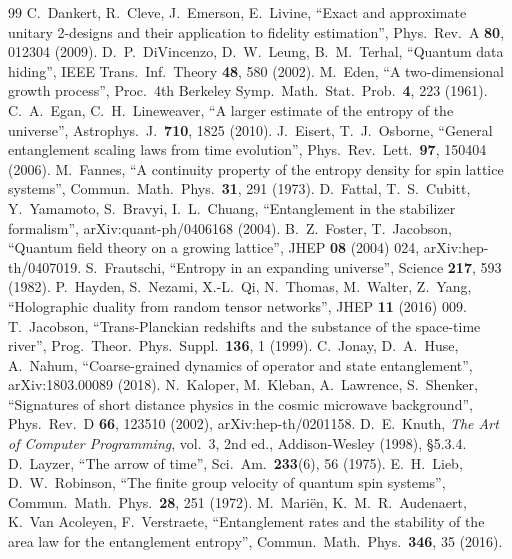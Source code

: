 \begin{thebibliography}{99}
 C.~Dankert, R.~Cleve, J.~Emerson, E.~Livine, ``Exact and approximate unitary 2-designs and their application to fidelity estimation'', Phys.\ Rev.\ A \textbf{80}, 012304 (2009).
 D.~P.~DiVincenzo, D.~W.~Leung, B.~M.~Terhal, ``Quantum data hiding'', IEEE Trans.\ Inf.\ Theory \textbf{48}, 580 (2002).
 M.~Eden, ``A two-dimensional growth process'', Proc.\ 4th Berkeley Symp.\ Math.\ Stat.\ Prob.\ \textbf{4}, 223 (1961).
 C.~A.~Egan, C.~H.~Lineweaver, ``A larger estimate of the entropy of the universe'', Astrophys.\ J.\ \textbf{710}, 1825 (2010).
 J.~Eisert, T.~J.~Osborne, ``General entanglement scaling laws from time evolution'', Phys.\ Rev.\ Lett.\ \textbf{97}, 150404 (2006).
 M.~Fannes, ``A continuity property of the entropy density for spin lattice systems'', Commun.\ Math.\ Phys.\ \textbf{31}, 291 (1973).
 D.~Fattal, T.~S.~Cubitt, Y.~Yamamoto, S.~Bravyi, I.~L.~Chuang, ``Entanglement in the stabilizer formalism'', arXiv:quant-ph/0406168 (2004).
 B.~Z.~Foster, T.~Jacobson, ``Quantum field theory on a growing lattice'', JHEP \textbf{08} (2004) 024, arXiv:hep-th/0407019.
 S.~Frautschi, ``Entropy in an expanding universe'', Science \textbf{217}, 593 (1982).
 P.~Hayden, S.~Nezami, X.-L.~Qi, N.~Thomas, M.~Walter, Z.~Yang, ``Holographic duality from random tensor networks'', JHEP \textbf{11} (2016) 009.
 T.~Jacobson, ``Trans-Planckian redshifts and the substance of the space-time river'', Prog.\ Theor.\ Phys.\ Suppl.\ \textbf{136}, 1 (1999).
 C.~Jonay, D.~A.~Huse, A.~Nahum, ``Coarse-grained dynamics of operator and state entanglement'', arXiv:1803.00089 (2018).
 N.~Kaloper, M.~Kleban, A.~Lawrence, S.~Shenker, ``Signatures of short distance physics in the cosmic microwave background'', Phys.\ Rev.\ D \textbf{66}, 123510 (2002), arXiv:hep-th/0201158.
 D.~E.~Knuth, \emph{The Art of Computer Programming}, vol.~3, 2nd ed., Addison-Wesley (1998), \S5.3.4.
 D.~Layzer, ``The arrow of time'', Sci.\ Am.\ \textbf{233}(6), 56 (1975).
 E.~H.~Lieb, D.~W.~Robinson, ``The finite group velocity of quantum spin systems'', Commun.\ Math.\ Phys.\ \textbf{28}, 251 (1972).
 M.~Mari\"en, K.~M.~R.~Audenaert, K.~Van Acoleyen, F.~Verstraete, ``Entanglement rates and the stability of the area law for the entanglement entropy'', Commun.\ Math.\ Phys.\ \textbf{346}, 35 (2016).

\end{thebibliography}
